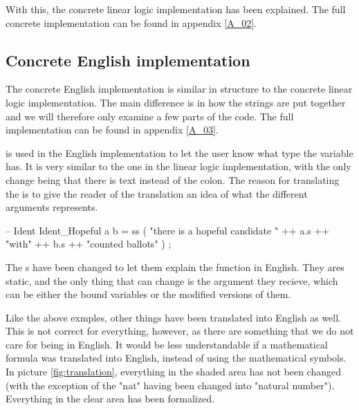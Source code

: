 With this, the concrete linear logic implementation has been explained. The full concrete implementation can be found in appendix \ref{A_02}.

\subsection{Concrete English implementation}
\label{04_02_02}

The concrete English implementation is similar in structure to the concrete linear logic implementation. The main difference is in how the strings are put together and we will therefore only examine a few parts of the code. The full implementation can be found in appendix \ref{A_03}.


 is used in the English implementation to let the user know what type the variable has. It is very similar to the one in the linear logic implementation, with the only change being that there is text instead of the colon. The reason for translating the  is to give the reader of the translation an idea of what the different arguments represents.

\begin{lstgf}
        -- Ident
        Ident_Hopeful a b
            = ss ( "there is a hopeful candidate " ++ a.s ++ "with" ++ b.s ++ "counted ballots" ) ;
\end{lstgf}

The s have been changed to let them explain the function in English. They ares static, and the only thing that can change is the argument they recieve, which can be either the bound variables or the modified versions of them. 

Like the above exmples, other things have been translated into English as well. This is not correct for everything, however, as there are something that we do not care for being in English. It would be less understandable if a mathematical formula was translated into English, instead of using the mathematical symbols. In picture \ref{fig:translation}, everything in the shaded area has not been changed (with the exception of the  "nat" having been changed into "natural number"). Everything in the clear area has been formalized.

